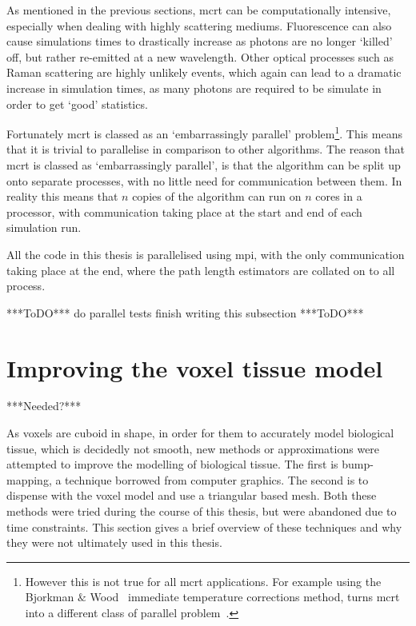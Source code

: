 As mentioned in the previous sections, \gls{mcrt} can be computationally intensive, especially when dealing with highly scattering mediums. Fluorescence can also cause simulations times to drastically increase as photons are no longer `killed' off, but rather re-emitted at a new wavelength. Other optical processes such as Raman scattering are highly unlikely events, which again can lead to a dramatic increase in simulation times, as many photons are required to be simulate in order to get `good' statistics.

Fortunately \gls{mcrt} is classed as an `embarrassingly parallel' problem\footnote{However this is not true for all \gls{mcrt} applications. For example using the Bjorkman $\&$ Wood~\cite{bjorkman2001radiative} immediate temperature corrections method, turns \gls{mcrt} into a different class of parallel problem~\cite{robitaille2011hyperion}.}. This means that it is trivial to parallelise in comparison to other algorithms. The reason that \gls{mcrt} is classed as `embarrassingly parallel', is that the algorithm can be split up onto separate processes, with no little need for communication between them. In reality this means that $n$ copies of the algorithm can run on $n$ cores in a processor, with communication taking place at the start and end of each simulation run. 

All the code in this thesis is parallelised using \gls{mpi}, with the only communication taking place at the end, where the path length estimators are collated on to all process. 

***ToDO***
do parallel tests
finish writing this subsection
***ToDO***

\section{Improving the voxel tissue model}\label{sec:improve}

***Needed?***

As voxels are cuboid in shape, in order for them to accurately model biological tissue, which is decidedly not smooth, new methods or approximations were attempted to improve the modelling of biological tissue. 
The first is bump-mapping, a technique borrowed from computer graphics. The second is to dispense with the voxel model and use a triangular based mesh. Both these methods were tried during the course of this thesis, but were abandoned due to time constraints. This section gives a brief overview of these techniques and why they were not ultimately used in this thesis.
